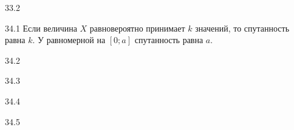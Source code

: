 \protect \hypertarget {soln:33.2}{}
\begin{solution}{{33.2}}
\end{solution}
\protect \hypertarget {soln:34.1}{}
\begin{solution}{{34.1}}
  Если величина $X$ равновероятно принимает $k$ значений, то спутанность равна $k$. У равномерной на $[0;a]$ спутанность равна $a$.
\end{solution}
\protect \hypertarget {soln:34.2}{}
\begin{solution}{{34.2}}
\end{solution}
\protect \hypertarget {soln:34.3}{}
\begin{solution}{{34.3}}
\end{solution}
\protect \hypertarget {soln:34.4}{}
\begin{solution}{{34.4}}
\end{solution}
\protect \hypertarget {soln:34.5}{}
\begin{solution}{{34.5}}
\end{solution}
